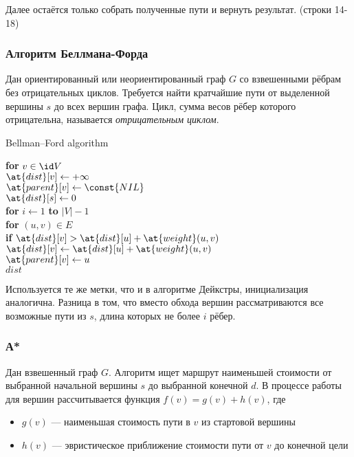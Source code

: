 \documentclass[12pt]{article}
\begin{document}
Далее остаётся только собрать полученные пути и вернуть результат. (строки 14-18)

\subsubsection{Алгоритм Беллмана-Форда}

Дан ориентированный или неориентированный граф $G$ со взвешенными рёбрам без отрицательных циклов. Требуется найти кратчайшие пути от выделенной вершины $s$ до всех вершин графа. Цикл, сумма весов рёбер которого отрицательна, называется \textit{отрицательным циклом}.

\begin{algorithm}
\caption{Bellman–Ford algorithm}
\begin{algorithmic}[1]

\State \textbf{for} $v \in \id V$ \\
    \qquad $\at{dist}[v] \gets +\infty$ \\
    \qquad $\at{parent}[v] \gets \const{NIL}$ \\
$\at{dist}[s] \gets 0$ \\

\State \textbf{for} $i \gets 1$ \textbf{to} $|V|-1$ \\
\qquad \textbf{for} $(u,v) \in E$ \\
\qquad \qquad \textbf{if} $\at{dist}[v] > \at{dist}[u] + \at{weight}(u,v)$ \\
\qquad \qquad \qquad $\at{dist}[v] \gets \at{dist}[u] + \at{weight}(u,v)$ \\
\qquad \qquad \qquad $\at{parent}[v] \gets u$ \\
\Return $dist$
\end{algorithmic}
\end{algorithm}

Используется те же метки, что и в алгоритме Дейкстры, инициализация аналогична. Разница в том, что вместо обхода вершин рассматриваются все возможные пути из $s$, длина которых не более $i$ рёбер.

\subsubsection{А*}

Дан взвешенный граф $G$. Алгоритм ищет маршрут наименьшей стоимости от выбранной начальной вершины $s$ до выбранной конечной $d$. В процессе работы для вершин рассчитывается функция $f(v)=g(v)+h(v)$, где

\begin{itemize}
    \item $g(v)$ — наименьшая стоимость пути в $v$ из стартовой вершины
    \item $h(v)$ — эвристическое приближение стоимости пути от $v$ до конечной цели
\end{itemize}
\end{document}
